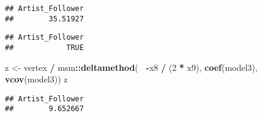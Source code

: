 \documentclass[
]{article}
\newenvironment{Shaded}{\begin{snugshade}}{\end{snugshade}}
\newcommand{\DecValTok}[1]{\textcolor[rgb]{0.00,0.00,0.81}{#1}}
\newcommand{\KeywordTok}[1]{\textcolor[rgb]{0.13,0.29,0.53}{\textbf{#1}}}
\newcommand{\NormalTok}[1]{#1}
\newcommand{\OperatorTok}[1]{\textcolor[rgb]{0.81,0.36,0.00}{\textbf{#1}}}
\newcommand{\StringTok}[1]{\textcolor[rgb]{0.31,0.60,0.02}{#1}}
\begin{document}
\begin{verbatim}
## Artist_Follower 
##        35.51927
\end{verbatim}

\begin{Shaded}
\end{Shaded}

\begin{verbatim}
## Artist_Follower 
##            TRUE
\end{verbatim}

\begin{Shaded}
\begin{Highlighting}[]
\NormalTok{z <-}\StringTok{ }\NormalTok{vertex }\OperatorTok{/}\StringTok{ }\NormalTok{msm}\OperatorTok{::}\KeywordTok{deltamethod}\NormalTok{(}\OperatorTok{~}\StringTok{ }\OperatorTok{-}\NormalTok{x8 }\OperatorTok{/}\StringTok{ }\NormalTok{(}\DecValTok{2} \OperatorTok{*}\StringTok{ }\NormalTok{x9), }\KeywordTok{coef}\NormalTok{(model3), }\KeywordTok{vcov}\NormalTok{(model3))}
\NormalTok{z}
\end{Highlighting}
\end{Shaded}

\begin{verbatim}
## Artist_Follower 
##        9.652667
\end{verbatim}
\end{document}

